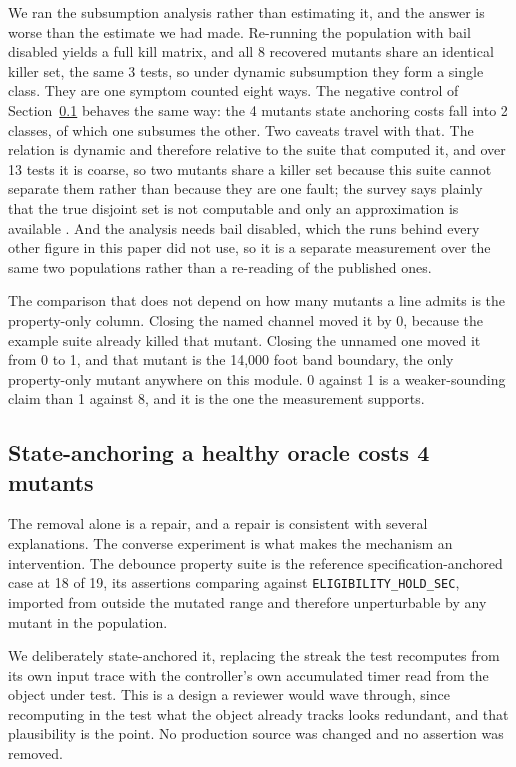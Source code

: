 \documentclass[12pt]{article}
\begin{document}
We ran the subsumption analysis rather than estimating it, and the answer is worse
than the estimate we had made. Re-running the population with bail disabled yields
a full kill matrix, and all 8 recovered mutants share an identical killer set, the
same 3 tests, so under dynamic subsumption they form a single class. They are one
symptom counted eight ways. The negative control of
Section~\ref{sec:negative} behaves the same way: the 4 mutants state anchoring
costs fall into 2 classes, of which one subsumes the other. Two caveats travel with
that. The relation is dynamic and therefore relative to the suite that computed it,
and over 13 tests it is coarse, so two mutants share a killer set because this
suite cannot separate them rather than because they are one fault; the survey says
plainly that the true disjoint set is not computable and only an approximation is
available \cite{papadakis2019}. And the analysis needs bail disabled, which the
runs behind every other figure in this paper did not use, so it is a separate
measurement over the same two populations rather than a re-reading of the
published ones.

The comparison that does not depend on how many mutants a line admits is the
property-only column. Closing the named channel moved it by 0, because the example
suite already killed that mutant. Closing the unnamed one moved it from 0 to
1, and that mutant is the 14{,}000 foot band boundary, the only property-only mutant
anywhere on this module. 0 against 1 is a weaker-sounding claim than 1
against 8, and it is the one the measurement supports.

\subsection{State-anchoring a healthy oracle costs 4 mutants}
\label{sec:negative}

The removal alone is a repair, and a repair is consistent with several
explanations. The converse experiment is what makes the mechanism an intervention.
The debounce property suite is the reference specification-anchored case at 18 of 19,
its assertions comparing against \texttt{ELIGIBILITY\_HOLD\_SEC}, imported from
outside the mutated range and therefore unperturbable by any mutant in the
population.

We deliberately state-anchored it, replacing the streak the test recomputes from
its own input trace with the controller's own accumulated timer read from the
object under test. This is a design a reviewer would wave through, since
recomputing in the test what the object already tracks looks redundant, and that
plausibility is the point. No production source was changed and no assertion was
removed.
\end{document}
